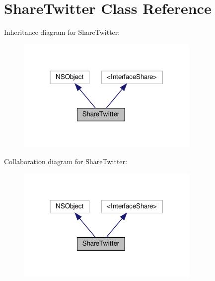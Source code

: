 \hypertarget{interfaceShareTwitter}{}\section{Share\+Twitter Class Reference}
\label{interfaceShareTwitter}


Inheritance diagram for Share\+Twitter\+:
\nopagebreak
\begin{figure}[H]
\begin{center}
\leavevmode
\includegraphics[width=250pt]{interfaceShareTwitter__inherit__graph}
\end{center}
\end{figure}


Collaboration diagram for Share\+Twitter\+:
\nopagebreak
\begin{figure}[H]
\begin{center}
\leavevmode
\includegraphics[width=250pt]{interfaceShareTwitter__coll__graph}
\end{center}
\end{figure}
